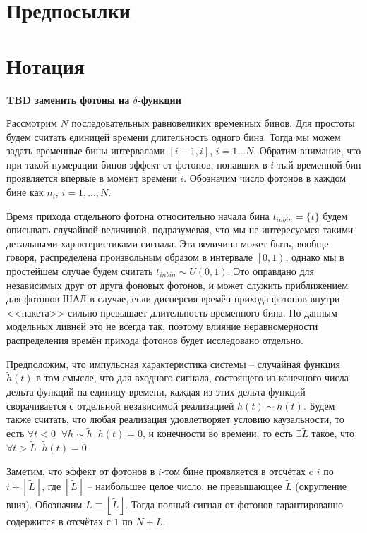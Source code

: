\documentclass[12pt]{book}
\begin{document}
	\section{Предпосылки}
	
	
	
	\section{Нотация}
	
	\textbf{TBD заменить фотоны на $\delta$-функции}
	
	Рассмотрим $N$ последовательных равновеликих временных бинов. Для простоты будем считать единицей времени длительность одного бина. Тогда мы можем задать временные бины интервалами $[i-1, i]$, $i = 1 \ldots N$. Обратим внимание, что при такой нумерации бинов эффект от фотонов, попавших в $i$-тый временной бин проявляется впервые в момент времени $i$. Обозначим число фотонов в каждом бине как $n_i$, $i = 1, \ldots, N$.

	Время прихода отдельного фотона относительно начала бина $t_{inbin} = \{ t \}$ будем описывать случайной величиной, подразумевая, что мы не интересуемся такими детальными характеристиками сигнала. Эта величина может быть, вообще говоря, распределена произвольным образом в интервале $\left[0, 1\right)$, однако мы в простейшем случае будем считать $t_{inbin} \sim U(0, 1)$. Это оправдано для независимых друг от друга фоновых фотонов, и может служить приближением для фотонов ШАЛ в случае, если дисперсия времён прихода фотонов внутри <<пакета>> сильно превышает длительность временного бина. По данным модельных ливней это не всегда так, поэтому влияние неравномерности распределения времён прихода фотонов будет исследовано отдельно.

	Предположим, что импульсная характеристика системы -- случайная функция $\tilde{h}(t)$ в том смысле, что для входного сигнала, состоящего из конечного числа дельта-функций на единицу времени, каждая из этих дельта функций сворачивается с отдельной независимой реализацией $h(t) \sim \tilde{h}(t)$. Будем также считать, что любая реализация удовлетворяет условию каузальности, то есть $\forall t < 0 \; \; \forall h \sim \tilde{h} \; \; h(t) = 0$, и конечности во времени, то есть $\exists \tilde{L}$ такое, что $\forall t > \tilde{L} \; \; \tilde{h}(t) = 0$.

	Заметим, что эффект от фотонов в $i$-том бине проявляется в отсчётах c $i$ по $i + \left \lfloor{\tilde{L}}\right \rfloor$, где $\left \lfloor{\tilde{L}}\right \rfloor$ -- наибольшее целое число, не превышающее $\tilde{L}$ (округление вниз). Обозначим $L \equiv \left \lfloor{\tilde{L}}\right \rfloor$. Тогда полный сигнал от фотонов гарантированно содержится в отсчётах с $1$ по $N + L$.
	
\end{document}
